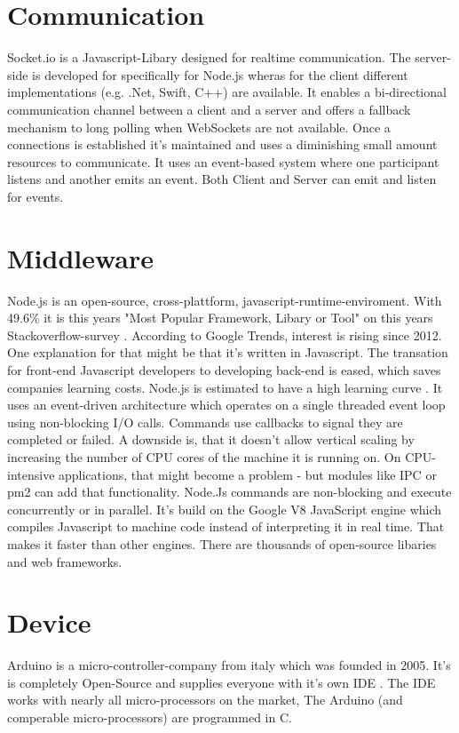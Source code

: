 \section{Communication}
Socket.io is a Javascript-Libary designed for realtime communication. 
The server-side is developed for specifically for Node.js wheras for the client different implementations (e.g. .Net, Swift, C++)\parencite{socketioClients} are available.
It enables a bi-directional communication channel between a client and a server and offers a fallback mechanism to long polling when WebSockets are not available.
Once a connections is established it's maintained and uses a diminishing small amount resources to communicate. 
It uses an event-based system where one participant listens and another emits an event. 
Both Client and Server can emit and listen for events.
\section{Middleware}
Node.js is an open-source, cross-plattform, javascript-runtime-enviroment. 
With 49.6\% it is this years "Most Popular Framework, Libary or Tool" on this years Stackoverflow-survey \parencite{stackOverflowSurvey}.
According to Google Trends, interest is rising since 2012\parencite{gogleTrendNode}.
One explanation for that might be that it's written in Javascript. 
The transation for front-end Javascript developers to developing back-end is eased, which saves companies learning costs.
Node.js is estimated to have a high learning curve \parencite{nodeLearningcurve}.
It uses an event-driven architecture which operates on a single threaded event loop using non-blocking I/O calls.
Commands use callbacks to signal they are completed or failed. 
A downside is, that it doesn't allow vertical scaling by increasing the number of CPU cores of the machine it is running on. 
On CPU-intensive applications, that might become a problem - but modules like IPC or pm2 can add that functionality.
Node.Js commands are non-blocking and execute concurrently or in parallel. 
It's build on the Google V8 JavaScript engine which compiles Javascript to machine code instead of interpreting it in real time. 
That makes it faster than other engines.
There are thousands of open-source libaries and web frameworks. 
\section{Device}
Arduino is a micro-controller-company from italy which was founded in 2005. It's is completely Open-Source and supplies everyone with it's own IDE \parencite{arduinoIDEDownload}.
The IDE works with nearly all micro-processors on the market, %
The Arduino (and comperable micro-processors) are programmed in C. 
